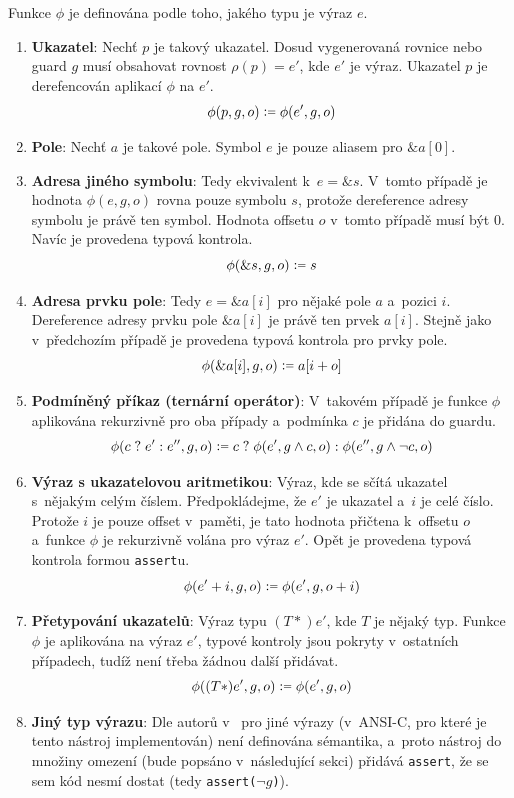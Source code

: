 \documentclass[a4paper, 11pt]{article}
\newcommand{\coloneqq}{%
  \mathrel{\mathop:\!\raisebox{0.2ex}{\scalebox{0.8}{$=$}}}
}
\begin{document}
Funkce $\phi$ je definována podle toho, jakého typu je výraz $e$.
\begin{enumerate}
    \item \textbf{Ukazatel}: Nechť $p$ je takový ukazatel.
          Dosud vygenerovaná rovnice nebo guard $g$ musí obsahovat rovnost $\rho(p) = e'$, kde $e'$ je výraz.
          Ukazatel $p$ je derefencován aplikací $\phi$ na $e'$.
          \[
              \phi(p, g, o) \coloneqq \phi(e', g, o)
          \]

    \item \textbf{Pole}: Nechť $a$ je takové pole.
          Symbol $e$ je pouze aliasem pro $\&a[0]$.

    \item \textbf{Adresa jiného symbolu}: Tedy ekvivalent k~$e = \&s$.
          V~tomto případě je hodnota $\phi(e, g, o)$ rovna pouze symbolu $s$, protože dereference adresy symbolu je právě ten symbol.
          Hodnota offsetu $o$ v~tomto případě musí být 0.
          Navíc je provedena typová kontrola.
          \[
              \phi(\&s, g, o) \coloneqq s
          \]

    \item \textbf{Adresa prvku pole}: Tedy $e = \&a[i]$ pro nějaké pole $a$ a~pozici $i$.
          Dereference adresy prvku pole $\&a[i]$ je právě ten prvek $a[i]$.
          Stejně jako v~předchozím případě je provedena typová kontrola pro prvky pole.
          \[
              \phi(\&a[i], g, o) \coloneqq a[i + o]
          \]

    \item \textbf{Podmíněný příkaz (ternární operátor)}: V~takovém případě je funkce $\phi$ aplikována rekurzivně pro oba případy a~podmínka $c$ je přidána do guardu.
          \[
              \phi(c \; ? \; e' : e'', g, o) \coloneqq c \; ? \; \phi(e', g \land c, o) : \phi(e'', g \land \neg c, o)
          \]

    \item \textbf{Výraz s ukazatelovou aritmetikou}: Výraz, kde se sčítá ukazatel s~nějakým celým číslem.
          Předpokládejme, že $e'$ je ukazatel a~$i$ je celé číslo.
          Protože $i$ je pouze offset v~paměti, je tato hodnota přičtena k~offsetu $o$ a~funkce $\phi$ je rekurzivně volána pro výraz $e'$.
          Opět je provedena typová kontrola formou \texttt{assert}u.
          \[
              \phi(e' + i, g, o) \coloneqq \phi(e', g, o + i)
          \]

    \item \textbf{Přetypování ukazatelů}: Výraz typu $(T*)e'$, kde $T$ je nějaký typ.
          Funkce $\phi$ je aplikována na výraz $e'$, typové kontroly jsou pokryty v~ostatních případech, tudíž není třeba žádnou další přidávat.
          \[
              \phi((T*)e', g, o) \coloneqq \phi(e', g, o)
          \]

    \item \textbf{Jiný typ výrazu}: Dle autorů v~\cite{clarke2003behavioral} pro jiné výrazy (v~ANSI-C, pro které je tento nástroj implementován) není definována sémantika, a~proto nástroj do množiny omezení (bude popsáno v~následující sekci) přidává \texttt{assert}, že se sem kód nesmí dostat (tedy \texttt{assert($\neg g$)}).
\end{enumerate}
\end{document}
